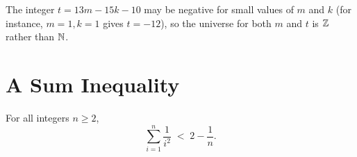 \begin{remark}
The integer $t = 13m - 15k - 10$ may be negative for small values of
$m$ and $k$ (for instance, $m = 1, k = 1$ gives $t = -12$), so the universe
for both $m$ and $t$ is $\mathbb{Z}$ rather than $\mathbb{N}$.
\end{remark}

\section{A Sum Inequality}

\begin{theorem}
For all integers $n \geq 2$,
\[
    \sum_{i=1}^{n} \frac{1}{i^2}
    \;<\;
    2 - \frac{1}{n}.
\]
\end{theorem}

